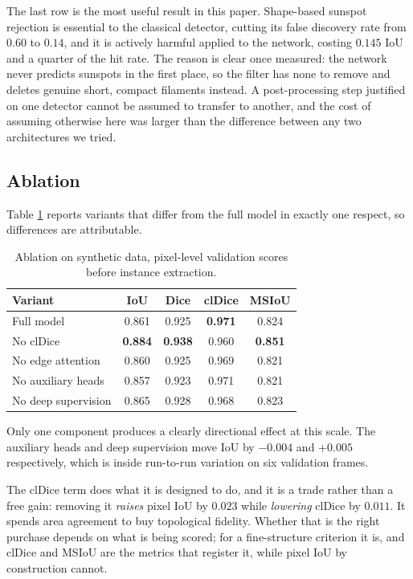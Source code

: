 \documentclass[11pt]{article}
\begin{document}
The last row is the most useful result in this paper. Shape-based sunspot
rejection is essential to the classical detector, cutting its false discovery
rate from $0.60$ to $0.14$, and it is actively harmful applied to the network,
costing $0.145$ IoU and a quarter of the hit rate. The reason is clear once
measured: the network never predicts sunspots in the first place, so the filter
has none to remove and deletes genuine short, compact filaments instead. A
post-processing step justified on one detector cannot be assumed to transfer to
another, and the cost of assuming otherwise here was larger than the difference
between any two architectures we tried.

\subsection{Ablation}

Table \ref{tab:ablation} reports variants that differ from the full model in
exactly one respect, so differences are attributable.

\begin{table}[h]
\begin{center}
\begin{tabular}{lcccc}
\toprule
Variant & IoU & Dice & clDice & MSIoU \\
\midrule
Full model & 0.861 & 0.925 & \textbf{0.971} & 0.824 \\
No clDice & \textbf{0.884} & \textbf{0.938} & 0.960 & \textbf{0.851} \\
No edge attention & 0.860 & 0.925 & 0.969 & 0.821 \\
No auxiliary heads & 0.857 & 0.923 & 0.971 & 0.821 \\
No deep supervision & 0.865 & 0.928 & 0.968 & 0.823 \\
\bottomrule
\end{tabular}
\caption{Ablation on synthetic data, pixel-level validation scores before
instance extraction.}\label{tab:ablation}
\end{center}
\end{table}

Only one component produces a clearly directional effect at this scale. The
auxiliary heads and deep supervision move IoU by $-0.004$ and $+0.005$
respectively, which is inside run-to-run variation on six validation frames.

The clDice term does what it is designed to do, and it is a trade rather than a
free gain: removing it \emph{raises} pixel IoU by $0.023$ while \emph{lowering}
clDice by $0.011$. It spends area agreement to buy topological fidelity. Whether
that is the right purchase depends on what is being scored; for a
fine-structure criterion it is, and clDice and MSIoU are the metrics that
register it, while pixel IoU by construction cannot.
\end{document}
